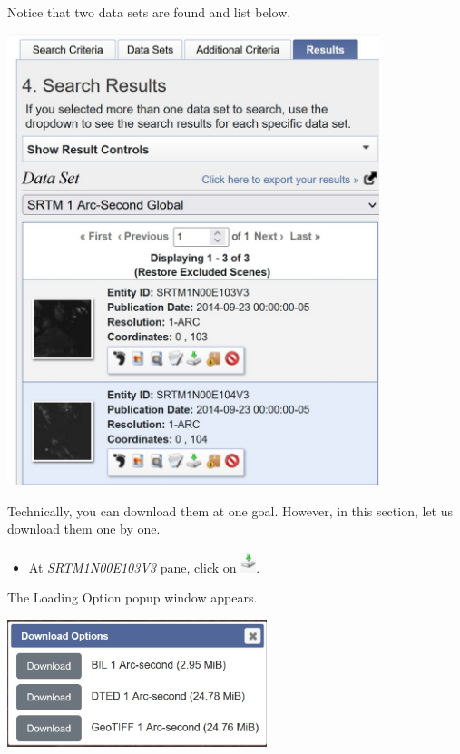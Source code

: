 \documentclass[
  letterpaper,
  DIV=11,
  numbers=noendperiod]{scrreprt}
\providecommand{\tightlist}{%
  \setlength{\itemsep}{0pt}\setlength{\parskip}{0pt}}\usepackage{longtable,booktabs,array}
\begin{document}
Notice that two data sets are found and list below.

\includegraphics[width=4.27083in,height=\textheight]{./img06/image30.jpg}

Technically, you can download them at one goal. However, in this
section, let us download them one by one.

\begin{itemize}
\tightlist
\item
  At \emph{SRTM1N00E103V3} pane, click on
  \includegraphics[width=0.17708in,height=0.25in]{./img06/image31.jpg}.
\end{itemize}

The Loading Option popup window appears.

\includegraphics[width=2.97917in,height=\textheight]{./img06/image32.jpg}
\end{document}
